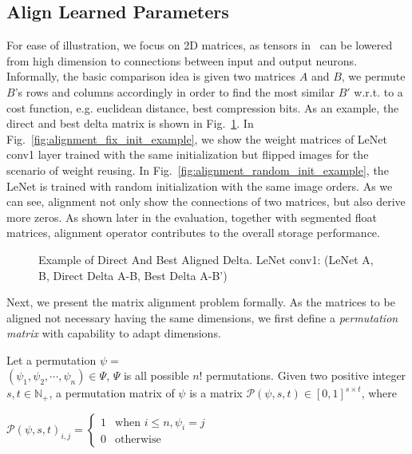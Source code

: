 \documentclass[conference]{IEEEtran}
\begin{document}
{\subsection{Align Learned Parameters}
For ease of illustration, we focus on 2D matrices, as tensors in \dnn\ can be lowered from high dimension to connections between input and output neurons.
Informally, the basic comparison idea is given two matrices $A$ and $B$, we permute $B$'s rows and columns accordingly in order to find the most similar $B'$ w.r.t. to a cost function, e.g. euclidean distance, best compression bits. As an example, the direct and best delta matrix is shown in Fig.~\ref{fig:alignment_examples}. In Fig.~\ref{fig:alignment_fix_init_example}, we show the weight matrices of LeNet conv1 layer trained with the same initialization but flipped images for the scenario of weight reusing. In Fig.~\ref{fig:alignment_random_init_example}, the LeNet is trained with random initialization with the same image orders. As we can see, alignment not only show the connections of two matrices, but also derive more zeros. As shown later in the evaluation, together with segmented float matrices, alignment operator contributes to the overall storage performance.


\begin{figure}[!t]
\caption{Example of Direct And Best Aligned Delta. LeNet conv1: {\small{(LeNet A, B, Direct Delta A-B, Best Delta A-B')}}}
\label{fig:alignment_examples}
\end{figure}






Next, we present the matrix alignment problem formally. As the matrices to be aligned not necessary having the same dimensions, we first define a \emph{permutation matrix} with capability to adapt dimensions.


\begin{definition}
Let a permutation $\mathbb{\psi} =$\\ $ (\psi_1, \psi_2, \cdots, \psi_n) \in \Psi$, $\Psi$ is all possible $n!$ permutations. Given two positive integer $s,t\in \mathbb{N}_+$, a permutation matrix of $\psi$ is a matrix $\mathcal{P}(\psi,s,t) \in [0,1]^{s \times t}$, where
\begin{center}
$\mathcal{P}(\psi,s,t)_{i,j} = \begin{cases}
1 &\text{when\ } i \leq n, \psi_i = j\\
0 &\text{otherwise}
\end{cases}$
\end{center}
\end{definition}


}
\end{document}
